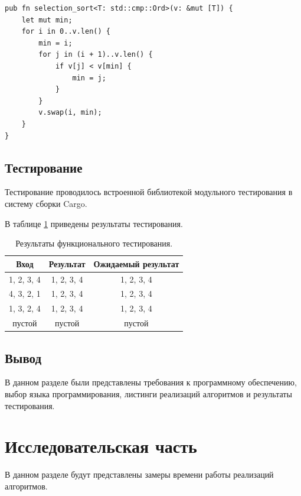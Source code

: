 \documentclass[a4paper,14pt, unknownkeysallowed]{extreport}
\begin{document}
\begin{lstlisting}[label=list:selection, caption=Функция сортировки массива методом выбора]
pub fn selection_sort<T: std::cmp::Ord>(v: &mut [T]) {
    let mut min;
    for i in 0..v.len() {
        min = i;
        for j in (i + 1)..v.len() {
            if v[j] < v[min] {
                min = j;
            }
        }
        v.swap(i, min);
    }
}
\end{lstlisting}

\clearpage

\section{Тестирование}

Тестирование проводилось встроенной библиотекой модульного тестирования в систему сборки Cargo.

В таблице \ref{tab:tests} приведены результаты тестирования.

\begin{table}[h]
    \centering
    \begin{tabular}{|c|c|c|}
    \hline
    Вход       & Результат  & Ожидаемый результат \\ \hline
    1, 2, 3, 4 & 1, 2, 3, 4 & 1, 2, 3, 4          \\ \hline
    4, 3, 2, 1 & 1, 2, 3, 4 & 1, 2, 3, 4          \\ \hline
    1, 3, 2, 4 & 1, 2, 3, 4 & 1, 2, 3, 4          \\ \hline
    пустой     & пустой     & пустой              \\ \hline
    \end{tabular}
    \caption{Результаты функционального тестирования.}
    \label{tab:tests}
\end{table}


\section*{Вывод}

В данном разделе были представлены требования к программному обеспечению, выбор языка программирования, листинги реализаций алгоритмов и результаты тестирования.

\chapter{Исследовательская часть}

В данном разделе будут представлены замеры времени работы реализаций алгоритмов.
\end{document}
